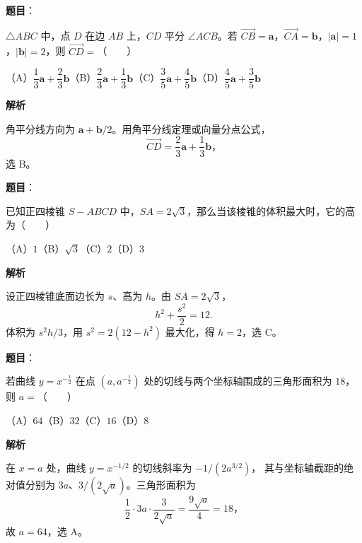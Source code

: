 \begin{answer}

\textbf{题目}：

$\triangle ABC$ 中，点 $D$ 在边 $AB$ 上，$CD$ 平分 $\angle ACB$。若 $\overrightarrow{CB}=\boldsymbol a$，$\overrightarrow{CA}=\boldsymbol b$，$|\boldsymbol a|=1$，$|\boldsymbol b|=2$，则 $\overrightarrow{CD}=$\mbox{（　　）}

（A）$\dfrac13\boldsymbol a+\dfrac23\boldsymbol b$\quad（B）$\dfrac23\boldsymbol a+\dfrac13\boldsymbol b$\quad（C）$\dfrac35\boldsymbol a+\dfrac45\boldsymbol b$\quad（D）$\dfrac45\boldsymbol a+\dfrac35\boldsymbol b$

\textbf{解析}

角平分线方向为 $\boldsymbol a+\boldsymbol b/2$。用角平分线定理或向量分点公式，
\nopagebreak[4]
\[
\overrightarrow{CD}=\frac23\boldsymbol a+\frac13\boldsymbol b\text{，}
\]
选 B。


\end{answer}
\begin{answer}

\textbf{题目}：

已知正四棱锥 $S-ABCD$ 中，$SA=2\sqrt3$，那么当该棱锥的体积最大时，它的高为\mbox{（　　）}

（A）$1$\quad（B）$\sqrt3$\quad（C）$2$\quad（D）$3$

\textbf{解析}

设正四棱锥底面边长为 $s$、高为 $h$。由 $SA=2\sqrt3$，
\nopagebreak[4]
\[
h^2+\frac{s^2}{2}=12.
\]
体积为 $s^2h/3$，用 $s^2=2(12-h^2)$ 最大化，得 $h=2$，选 C。


\end{answer}
\begin{answer}

\textbf{题目}：

若曲线 $y=x^{-\frac12}$ 在点 $\left(a,a^{-\frac12}\right)$ 处的切线与两个坐标轴围成的三角形面积为 $18$，则 $a=$\mbox{（　　）}

（A）$64$\quad（B）$32$\quad（C）$16$\quad（D）$8$

\textbf{解析}

在 $x=a$ 处，曲线 $y=x^{-1/2}$ 的切线斜率为 $-1/(2a^{3/2})$，
其与坐标轴截距的绝对值分别为 $3a$、$3/(2\sqrt a)$。三角形面积为
\nopagebreak[4]
\[
\frac12\cdot3a\cdot\frac3{2\sqrt a}=\frac{9\sqrt a}{4}=18\text{，}
\]
故 $a=64$，选 A。


\end{answer}
